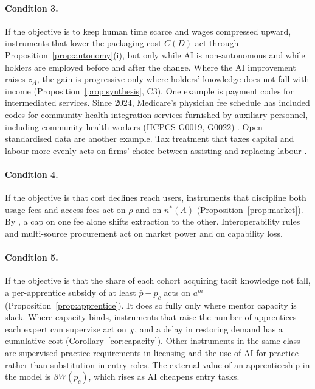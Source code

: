 \documentclass[12pt]{article}
\theoremstyle{remark}
\begin{document}
\paragraph{Condition 3.} If the objective is to keep human time scarce and wages compressed upward, instruments that lower the packaging cost $C(D)$ act through Proposition~\ref{prop:autonomy}(i), but only while AI is non-autonomous and while holders are employed before and after the change. Where the AI improvement raises $z_A$, the gain is progressive only where holders' knowledge does not fall with income (Proposition~\ref{prop:synthesis}, C3). One example is payment codes for intermediated services. Since 2024, Medicare's physician fee schedule has included codes for community health integration services furnished by auxiliary personnel, including community health workers (HCPCS G0019, G0022) \citep{cms2023pfs}. Open standardised data are another example. Tax treatment that taxes capital and labour more evenly acts on firms' choice between assisting and replacing labour \citep{acemoglu2020tax}.

\paragraph{Condition 4.} If the objective is that cost declines reach users, instruments that discipline both usage fees and access fees act on $\rho$ and on $n^*(A)$ (Proposition~\ref{prop:market}). By \citet[p.~110]{athey2026competition}, a cap on one fee alone shifts extraction to the other. Interoperability rules and multi-source procurement act on market power and on capability loss.

\paragraph{Condition 5.} If the objective is that the share of each cohort acquiring tacit knowledge not fall, a per-apprentice subsidy of at least $\bar p-p_c$ acts on $a^m$ (Proposition~\ref{prop:apprentice}). It does so fully only where mentor capacity is slack. Where capacity binds, instruments that raise the number of apprentices each expert can supervise act on $\chi$, and a delay in restoring demand has a cumulative cost (Corollary~\ref{cor:capacity}). Other instruments in the same class are supervised-practice requirements in licensing and the use of AI for practice rather than substitution in entry roles. The external value of an apprenticeship in the model is $\beta W(p_c)$, which rises as AI cheapens entry tasks.
\end{document}
